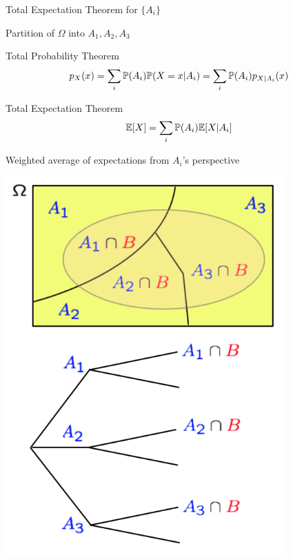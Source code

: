\begin{frame}{Total Expectation Theorem for $\{A_i \}$}

{
\plitemsep 0.1in
\bci 

\item Partition of $\Omega$ into $A_1,A_2,A_3$


\bigskip
\begin{block}{Total Probability Theorem}
$$
p_X(x) = \sum_{i} \mathbb{P}( A_i ) \mathbb{P}( X=x | A_i ) = \sum_{i} \mathbb{P}( A_i ) p_{X|A_i}(x) 
$$
\end{block}

\begin{block}{Total Expectation Theorem}
$$
\mathbb{E}[ X ] = \sum_{i} \mathbb{P}( A_i ) \mathbb{E}[ X | A_i ]
$$
\end{block}

\item Weighted average of expectations from $A_i$'s perspective

\eci 
}
{
\centering
\includegraphics[width=0.8\textwidth]{L2_total_ex.png}
}

\end{frame}

